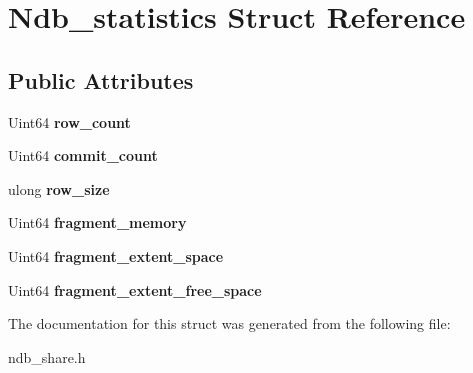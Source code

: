 \hypertarget{structNdb__statistics}{}\section{Ndb\+\_\+statistics Struct Reference}
\label{structNdb__statistics}
\subsection*{Public Attributes}
\begin{DoxyCompactItemize}
\item 
\mbox{\label{structNdb__statistics_ad51be3a5f0772c9f2bcd574ef3c0708c}} 
Uint64 {\bfseries row\+\_\+count}
\item 
\mbox{\label{structNdb__statistics_aa47b0f182be5426f51df64633ab7eb46}} 
Uint64 {\bfseries commit\+\_\+count}
\item 
\mbox{\label{structNdb__statistics_a1c3d54b001cfc404e46e06bbd57542f9}} 
ulong {\bfseries row\+\_\+size}
\item 
\mbox{\label{structNdb__statistics_ac6483de02a17f6ba1266f044de442fe4}} 
Uint64 {\bfseries fragment\+\_\+memory}
\item 
\mbox{\label{structNdb__statistics_abf2330858c25f8dffe31580df60ccbbf}} 
Uint64 {\bfseries fragment\+\_\+extent\+\_\+space}
\item 
\mbox{\label{structNdb__statistics_a468a26b40a0f98638dc8c702c4dc24b7}} 
Uint64 {\bfseries fragment\+\_\+extent\+\_\+free\+\_\+space}
\end{DoxyCompactItemize}


The documentation for this struct was generated from the following file\+:\begin{DoxyCompactItemize}
\item 
ndb\+\_\+share.\+h\end{DoxyCompactItemize}
